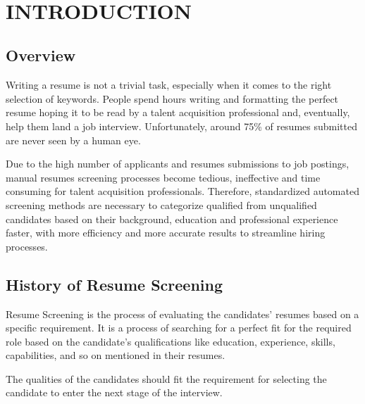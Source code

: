 \documentclass[12 pt, oneside]{book}
\begin{document}
\tableofcontents
{}\
\listoffigures

\mainmatter			
%

\chapter{INTRODUCTION} %
\setlength{\parindent}{20pt}
\section{Overview}    %

Writing a resume is not a trivial task, especially when it comes to the right selection of keywords. People spend hours writing and formatting the perfect resume hoping it to be read by a talent acquisition professional and, eventually, help them land a job interview. Unfortunately, around 75\% of resumes submitted are never seen by a human eye.

Due to the high number of applicants and resumes submissions to job postings, manual resumes screening processes become tedious, ineffective and time consuming for talent acquisition professionals. Therefore, standardized automated screening methods are necessary to categorize qualified from unqualified candidates based on their background, education and professional experience faster, with more efficiency and more accurate results to streamline hiring processes.


\section{History of Resume Screening}
Resume Screening is the process of evaluating the 
candidates' resumes based on a specific requirement.
It is a process of searching for a perfect fit for the required 
role based on the candidate's qualifications like education, 
experience, skills, capabilities, and so on mentioned in their 
resumes.
\par
The qualities of the candidates should fit the requirement 
for selecting the candidate to enter the next stage of the 
interview.
\end{document}
